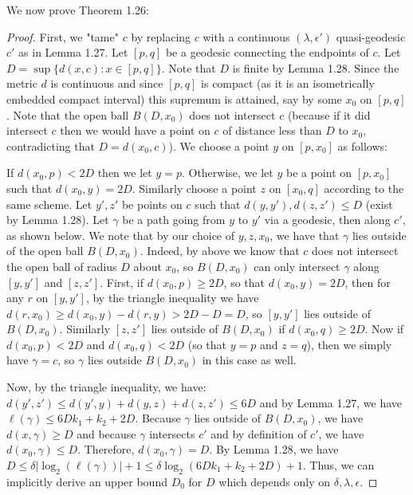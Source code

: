 \documentclass[12pt]{article}
\newcommand{\vs}{\vskip10pt}
\begin{document}
	\vs 
	
	We now prove Theorem 1.26: 
	
	\begin{proof}
		
		First, we "tame" $c$ by replacing $c$ with a continuous $(\lambda, \epsilon')$ quasi-geodesic $c'$ as in Lemma 1.27. Let $[p,q]$ be a geodesic connecting the endpoints of $c$. Let $D = \sup \{d(x,c): x \in [p,q]\}$. Note that $D$ is finite by Lemma 1.28. Since the metric $d$ is continuous and since $[p,q]$ is compact (as it is an isometrically embedded compact interval) this supremum is attained, say by some $x_0$ on $[p,q]$. Note that the open ball $B(D, x_0)$ does not intersect $c$ (because if it did intersect $c$ then we would have a point on $c$ of distance less than $D$ to $x_0$, contradicting that $D = d(x_0,c)$). We choose a point $y$ on $[p,x_0]$ as follows: 
		
		\vs 
		
		If $d(x_0, p) < 2D$ then we let $y = p$. Otherwise, we let $y$ be a point on $[p, x_0]$ such that $d(x_0, y) = 2D$. Similarly choose a point $z$ on $[x_0, q]$ according to the same scheme. Let $y', z'$ be points on $c$ such that $d(y, y'), d(z, z') \leq D$ (exist by Lemma 1.28). Let $\gamma$ be a path going from $y$ to $y'$ via a geodesic, then along $c'$, as shown below. We note that by our choice of $y,z,x_0$, we have that $\gamma$ lies outside of the open ball $B(D, x_0)$. Indeed, by above we know that $c$ does not intersect the open ball of radius $D$ about $x_0$, so $B(D, x_0)$ can only intersect $\gamma$ along $[y, y']$ and $[z, z']$. First, if $d(x_0, p) \geq 2D$, so that $d(x_0, y) = 2D$, then for any $r$ on $[y, y']$, by the triangle inequality we have $d(r, x_0) \geq d(x_0, y) - d(r,y) > 2D - D = D$, so $[y, y']$ lies outside of $B(D, x_0)$. Similarly $[z,z']$ lies outside of $B(D, x_0)$ if $d(x_0, q) \geq 2D$. Now if $d(x_0, p) < 2D$ and $d(x_0, q) < 2D$ (so that $y =p$ and $z = q$), then we simply have $\gamma = c$, so $\gamma$ lies outside $B(D, x_0)$ in this case as well. 
		
		\vs
		
		Now, by the triangle inequality, we have: $d(y', z') \leq d(y', y) + d(y,z) + d(z, z') \leq 6 D$ and by Lemma 1.27, we have $\ell(\gamma) \leq 6Dk_1 + k_2 + 2D$. Because $\gamma$ lies outside of $B(D, x_0)$, we have $d(x, \gamma) \geq D$ and because $\gamma$ intersects $c'$ and by definition of $c'$, we have $d(x_0, \gamma) \leq D$. Therefore, $d(x_0, \gamma) = D$. By Lemma 1.28, we have $D \leq \delta \vert \log_2 (\ell(\gamma)) \vert + 1 \leq \delta \log_2 (6 D k_1 + k_2 + 2D) + 1$. Thus, we can implicitly derive an upper bound $D_0$ for $D$ which depends only on $\delta, \lambda, \epsilon$. 
		

\end{proof}
\end{document}

